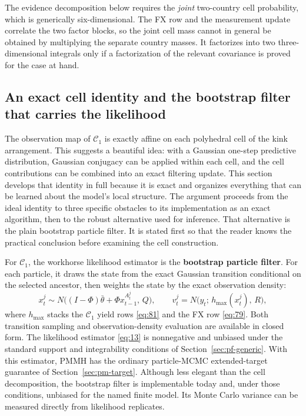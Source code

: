 \documentclass[11pt]{article}
\begin{document}
The evidence decomposition below requires the \emph{joint} two-country cell probability, which is generically six-dimensional. The FX row and the measurement update correlate the two factor blocks, so the joint cell mass cannot in general be obtained by multiplying the separate country masses. It factorizes into two three-dimensional integrals only if a factorization of the relevant covariance is proved for the case at hand.

\subsection{An exact cell identity and the bootstrap filter that carries
the likelihood}
\label{sec:shadow-filter}

The observation map of \(\mathcal C_1\) is exactly affine on each polyhedral cell of the kink arrangement. This suggests a beautiful idea: with a Gaussian one-step predictive distribution, Gaussian conjugacy can be applied within each cell, and the cell contributions can be combined into an exact filtering update. This section develops that identity in full because it is exact and organizes everything that can be learned about the model's local structure. The argument proceeds from the ideal identity to three specific obstacles to its implementation as an exact algorithm, then to the robust alternative used for inference. That alternative is the plain bootstrap particle filter. It is stated first so that the reader knows the practical conclusion before examining the cell construction.

For \(\mathcal C_1\), the workhorse likelihood estimator is the \textbf{bootstrap particle filter}. For each particle, it draws the state from the exact Gaussian transition conditional on the selected ancestor, then weights the state by the exact observation density:
\begin{equation}\label{eq:82a}
 x_t^j\sim N\bigl((I-\Phi)\bar\theta+\Phi x_{t-1}^{A_t^j},\,Q\bigr),
 \qquad
 v_t^j=N\bigl(y_t;\,h_{\max}(x_t^j),\,R\bigr),
\end{equation}
where \(h_{\max}\) stacks the \(\mathcal C_1\) yield rows \eqref{eq:81} and the FX row \eqref{eq:79}. Both transition sampling and observation-density evaluation are available in closed form. The likelihood estimator \eqref{eq:13} is nonnegative and unbiased under the standard support and integrability conditions of Section~\ref{sec:pf-generic}. With this estimator, PMMH has the ordinary particle-MCMC extended-target guarantee of Section~\ref{sec:pm-target}. Although less elegant than the cell decomposition, the bootstrap filter is implementable today and, under those conditions, unbiased for the named finite model. Its Monte Carlo variance can be measured directly from likelihood replicates.
\end{document}
